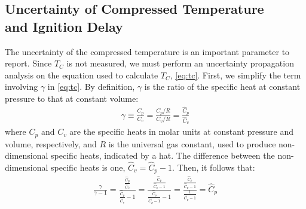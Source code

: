 \documentclass[../main.tex]{subfiles}
\begin{document}
\subsection[Uncertainty of Compressed Temperature and Ignition Delay]%
{Uncertainty of Compressed Temperature\\ and Ignition Delay}
\label{sec:uncertainty}

The uncertainty of the compressed temperature is an important parameter
to report. Since $T_C$ is not measured, we must perform an uncertainty
propagation analysis on the equation used to calculate $T_C$,
\cref{eq:tc}. First, we simplify the term involving $\gamma$ in
\cref{eq:tc}. By definition, $\gamma$ is the ratio of the specific heat
at constant pressure to that at constant volume:
%
\begin{align}
\gamma \equiv \frac{C_p}{C_v} = \frac{C_p/R}{C_v/R} = \frac{\hat{C}_p}{\hat{C}_v}
\end{align}
%
where $C_p$ and $C_v$ are the specific heats in molar units at constant
pressure and volume, respectively, and $R$ is the universal gas constant,
used to produce non-dimensional specific heats, indicated by a hat. The
difference between the non-dimensional specific heats is one,
$\hat{C}_v = \hat{C}_p - 1$. Then, it follows that:
%
\begin{align}
\label{eq:simplify-gamma}
\frac{\gamma}{\gamma - 1} = \frac{\frac{\hat{C}_p}{\hat{C}_v}}{\frac{\hat{C}_p}{\hat{C}_v} - 1}
= \frac{\frac{\hat{C}_p}{\hat{C}_p - 1}}{\frac{\hat{C}_p}{\hat{C}_p - 1} - 1}
= \frac{\frac{\hat{C}_p}{\hat{C}_p - 1}}{\frac{1}{\hat{C}_p - 1}}
= \hat{C}_p
\end{align}
\end{document}
